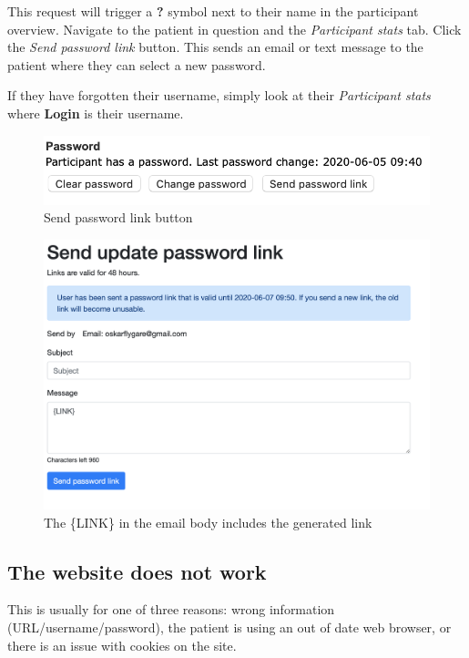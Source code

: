\documentclass[]{book}
\begin{document}
This request will trigger a \textbf{?} symbol next to their name in the participant overview. Navigate to the patient in question and the \emph{Participant stats} tab. Click the \emph{Send password link} button. This sends an email or text message to the patient where they can select a new password.

If they have forgotten their username, simply look at their \emph{Participant stats} where \textbf{Login} is their username.

\begin{figure}
\centering
\includegraphics{images/password-link-button.png}
\caption{Send password link button}
\end{figure}

\begin{figure}
\centering
\includegraphics{images/password-link-window.png}
\caption{The \{LINK\} in the email body includes the generated link}
\end{figure}

\hypertarget{the-website-does-not-work}{%
\subsection{The website does not work}\label{the-website-does-not-work}}

This is usually for one of three reasons: wrong information (URL/username/password), the patient is using an out of date web browser, or there is an issue with cookies on the site.
\end{document}
